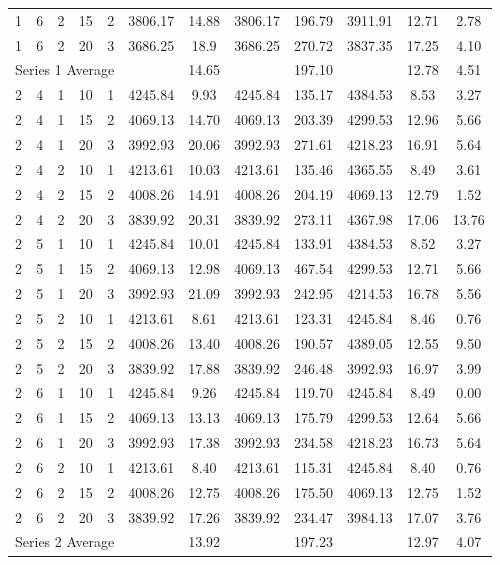 \documentclass[preprint,review,11pt,authoryear]{elsarticle}
\begin{document}
\begin{table}[!h]
{\begin{tabular}{|c|cccc|cc|cc|ccc|}
            1 & 6 & 2 & 15 & 2 & 3806.17 & 14.88 & 3806.17 & 196.79 & 3911.91 & 12.71 & 2.78 \\
            1 & 6 & 2 & 20 & 3 & 3686.25 & 18.9 & 3686.25 & 270.72 & 3837.35 & 17.25 & 4.10 \\
            \hline
            \multicolumn{5}{|c|}{Series 1 Average} & & 14.65 & & 197.10 & & 12.78 & 4.51 \\
            \hline
            2 & 4 & 1 & 10 & 1 & 4245.84 & 9.93 & 4245.84 & 135.17 & 4384.53 & 8.53 & 3.27 \\
            2 & 4 & 1 & 15 & 2 & 4069.13 & 14.70 & 4069.13 & 203.39 & 4299.53 & 12.96 & 5.66 \\
            2 & 4 & 1 & 20 & 3 & 3992.93 & 20.06 & 3992.93 & 271.61 & 4218.23 & 16.91 & 5.64 \\
            2 & 4 & 2 & 10 & 1 & 4213.61 & 10.03 & 4213.61 & 135.46 & 4365.55 & 8.49 & 3.61 \\
            2 & 4 & 2 & 15 & 2 & 4008.26 & 14.91 & 4008.26 & 204.19 & 4069.13 & 12.79 & 1.52 \\
            2 & 4 & 2 & 20 & 3 & 3839.92 & 20.31 & 3839.92 & 273.11 & 4367.98 & 17.06 & 13.76 \\
            2 & 5 & 1 & 10 & 1 & 4245.84 & 10.01 & 4245.84 & 133.91 & 4384.53 & 8.52 & 3.27 \\
            2 & 5 & 1 & 15 & 2 & 4069.13 & 12.98 & 4069.13 & 467.54 & 4299.53 & 12.71 & 5.66 \\
            2 & 5 & 1 & 20 & 3 & 3992.93 & 21.09 & 3992.93 & 242.95 & 4214.53 & 16.78 & 5.56 \\
            2 & 5 & 2 & 10 & 1 & 4213.61 & 8.61 & 4213.61 & 123.31 & 4245.84 & 8.46 & 0.76 \\
            2 & 5 & 2 & 15 & 2 & 4008.26 & 13.40 & 4008.26 & 190.57 & 4389.05 & 12.55 & 9.50 \\
            2 & 5 & 2 & 20 & 3 & 3839.92 & 17.88 & 3839.92 & 246.48 & 3992.93 & 16.97 & 3.99 \\
            2 & 6 & 1 & 10 & 1 & 4245.84 & 9.26 & 4245.84 & 119.70 & 4245.84 & 8.49 & 0.00 \\
            2 & 6 & 1 & 15 & 2 & 4069.13 & 13.13 & 4069.13 & 175.79 & 4299.53 & 12.64 & 5.66 \\
            2 & 6 & 1 & 20 & 3 & 3992.93 & 17.38 & 3992.93 & 234.58 & 4218.23 & 16.73 & 5.64 \\
            2 & 6 & 2 & 10 & 1 & 4213.61 & 8.40 & 4213.61 & 115.31 & 4245.84 & 8.40 & 0.76 \\
            2 & 6 & 2 & 15 & 2 & 4008.26 & 12.75 & 4008.26 & 175.50 & 4069.13 & 12.75 & 1.52 \\
            2 & 6 & 2 & 20 & 3 & 3839.92 & 17.26 & 3839.92 & 234.47 & 3984.13 & 17.07 & 3.76 \\
            \hline
            \multicolumn{5}{|c|}{Series 2 Average} & & 13.92 & & 197.23 & & 12.97 & 4.07 \\
            \hline
    \end{tabular}}
\end{table}
\end{document}
